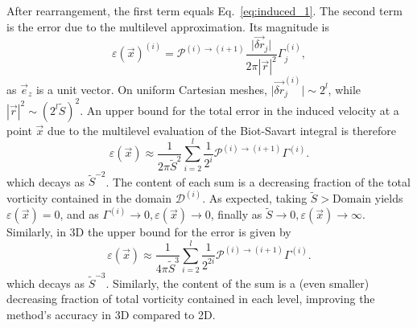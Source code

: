 \documentclass[final,1p,times]{elsarticle}
\begin{document}
After rearrangement, the first term equals Eq.~\ref{eq:induced_1}. The second term is the error due to the multilevel approximation. Its magnitude is
\begin{equation}
    \varepsilon(\vec{x})^{(i)} = \mathcal{P}^{(i)\to(i+1)}\frac{\vert\vec{\delta r}_j\vert}{2\pi|\vec{r}|^2}\Gamma^{(i)}_j,
\end{equation}
as $\vec{e}_z$ is a unit vector. On uniform Cartesian meshes, $\vert\vec{\delta r}_j^{(i)}\vert\sim2^{l}$, while $|\vec{r}|^2 \sim (2^l\tilde{S})^2$. An upper bound for the total error in the induced velocity at a point $\vec x$ due to the multilevel evaluation of the Biot-Savart integral is therefore
\begin{equation}
    \varepsilon(\vec{x}) \approx \frac{1}{2\pi\tilde{S}^2}\sum_{i=2}^{l}\frac{1}{2^i}\mathcal{P}^{(i)\to(i+1)}
    \Gamma^{(i)}.
\end{equation}
which decays as $\tilde{S}^{-2}$. The content of each sum is a decreasing fraction of the total vorticity contained in the domain $\mathcal{D}^{(i)}$. As expected, taking $\tilde{S}>\text{Domain}$ yields $\varepsilon(\vec{x}) = 0$, and as $\Gamma^{(i)} \to 0, \varepsilon(\vec{x})\to 0$, finally as $\tilde{S}\to0, \varepsilon(\vec{x}) \to \infty$. Similarly, in 3D the upper bound for the error is given by
\begin{equation}
    \varepsilon(\vec{x}) \approx \frac{1}{4\pi\tilde{S}^3}\sum_{i=2}^{l}\frac{1}{2^{2i}}\mathcal{P}^{(i)\to(i+1)}
    \Gamma^{(i)}.
\end{equation}
which decays as $\tilde{S}^{-3}$. Similarly, the content of the sum is a (even smaller) decreasing fraction of total vorticity contained in each level, improving the method's accuracy in 3D compared to 2D.


\end{document}
